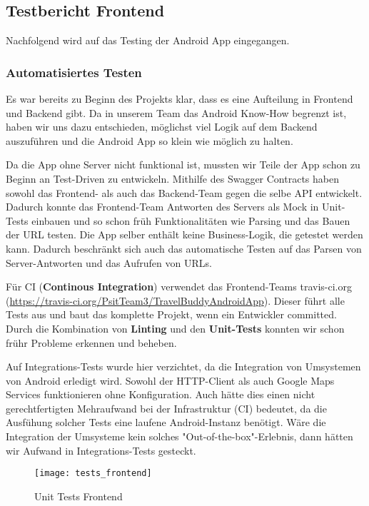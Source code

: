 \subsection{Testbericht Frontend}\label{testbericht_frontend}
Nachfolgend wird auf das Testing der Android App eingegangen.

\subsubsection{Automatisiertes Testen}\label{automatisiertes_test_frontend}
Es war bereits zu Beginn des Projekts klar, dass es eine Aufteilung in Frontend und Backend
gibt. Da in unserem Team das Android Know-How begrenzt ist, haben wir uns dazu entschieden,
möglichst viel Logik auf dem Backend auszuführen und die Android App so klein wie möglich zu halten.

Da die App ohne Server nicht funktional ist, mussten wir Teile der App schon zu Beginn an
Test-Driven zu entwickeln. Mithilfe des Swagger Contracts haben sowohl das Frontend- als auch das
Backend-Team gegen die selbe API entwickelt. Dadurch konnte das Frontend-Team Antworten des Servers
als Mock in Unit-Tests einbauen und so schon früh Funktionalitäten wie Parsing und das Bauen der URL
testen. Die App selber enthält keine Business-Logik, die getestet werden kann. Dadurch beschränkt sich
auch das automatische Testen auf das Parsen von Server-Antworten und das Aufrufen von URLs.

Für CI (\textbf{Continous Integration}) verwendet das Frontend-Teams travis-ci.org 
(\url{https://travis-ci.org/PsitTeam3/TravelBuddyAndroidApp}). Dieser führt alle Tests
aus und baut das komplette Projekt, wenn ein Entwickler committed. Durch die Kombination von \textbf{Linting}
und den \textbf{Unit-Tests} konnten wir schon frühr Probleme erkennen und beheben.

Auf Integrations-Tests wurde hier verzichtet, da die Integration von Umsystemen von Android erledigt
wird. Sowohl der HTTP-Client als auch Google Maps Services funktionieren ohne Konfiguration. Auch hätte
dies einen nicht gerechtfertigten Mehraufwand bei der Infrastruktur (CI) bedeutet, da die Ausfühung
solcher Tests eine laufene Android-Instanz benötigt. Wäre die Integration der Umsysteme kein solches
"Out-of-the-box"-Erlebnis, dann hätten wir Aufwand in Integrations-Tests gesteckt.

\begin{figure}
  \centering
  \texttt{[image: tests\_frontend]}
  \caption{Unit Tests Frontend}
\end{figure}

